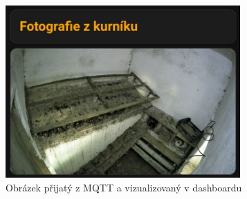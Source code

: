\begin{figure}[H]
    \centering
    \includegraphics[width=0.8\textwidth]{img/foto_z_guarda}
    \caption{Obrázek přijatý z MQTT a vizualizovaný v dashboardu}
    \label{fig:foto_z_guarda}
\end{figure}

%
